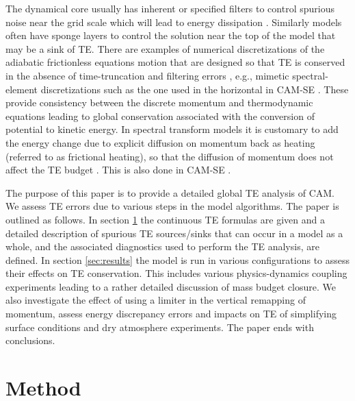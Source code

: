 \documentclass[draft,linenumbers]{agujournal}
\begin{document}
The dynamical core usually has inherent or specified filters to control spurious noise near the grid scale which will lead to energy dissipation \citep{T2008JCP,JW2010LNCSE}. Similarly models often have sponge layers to control the solution near the top of the model that may be a sink of TE. There are examples of numerical discretizations of the adiabatic frictionless equations motion that are designed so that TE is conserved in the absence of time-truncation and filtering errors \citep[e.g., ][]{ER2017GMD,MC2013QJRMS}, e.g., mimetic spectral-element discretizations such as the one used in the horizontal in CAM-SE \citep{T2011LNCSEb}. These provide consistency between the discrete momentum and thermodynamic equations leading to global conservation associated with the conversion of potential to kinetic energy. In spectral transform models it is customary to add the energy change due to explicit diffusion on momentum back as heating (referred to as frictional heating), so that the diffusion of momentum does not affect the TE budget \citep[see, e.g., p.71 in ][]{CAM5}. This is also done in CAM-SE \citep{LetAl2018JAMES}. 

The purpose of this paper is to provide a detailed global TE analysis of CAM. We assess TE errors due to various steps in the model algorithms. The paper is outlined as follows. In section \ref{sec:methods} the continuous TE formulas are given and a detailed description of spurious TE sources/sinks that can occur in a model as a whole, and the associated diagnostics used to perform the TE analysis, are defined. In section \ref{sec:results} the model is run in various configurations to assess their effects on TE conservation. This includes various physics-dynamics coupling experiments leading to a rather detailed discussion of mass budget closure. We also investigate the effect of using a limiter in the vertical remapping of momentum, assess energy discrepancy errors and impacts on TE of simplifying surface conditions and dry atmosphere experiments. The paper ends with conclusions.



\section{Method}
\label{sec:methods}
\end{document}
